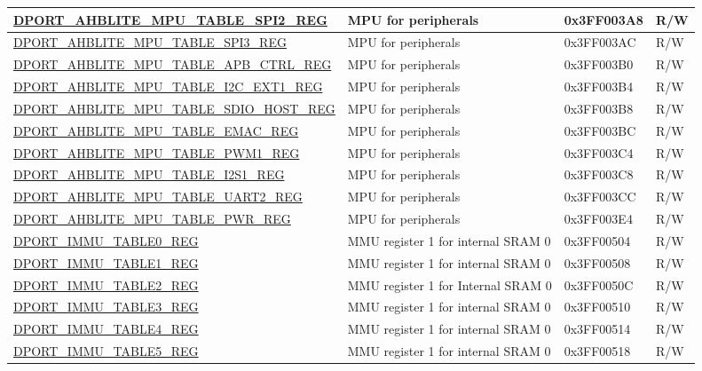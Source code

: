 \begin{longtable}{ |L{8.2cm} | L{4.5cm} | l | l | }
\hyperref[regdesc:AHBLITEMPUTABLESPI2REG]{DPORT\_AHBLITE\_MPU\_TABLE\_SPI2\_REG} & MPU for peripherals & 0x3FF003A8 & R/W \\ \hline
\hyperref[regdesc:AHBLITEMPUTABLESPI3REG]{DPORT\_AHBLITE\_MPU\_TABLE\_SPI3\_REG} & MPU for peripherals & 0x3FF003AC & R/W \\ \hline
\hyperref[regdesc:AHBLITEMPUTABLEAPBCTRLREG]{DPORT\_AHBLITE\_MPU\_TABLE\_APB\_CTRL\_REG} & MPU for peripherals & 0x3FF003B0 & R/W \\ \hline
\hyperref[regdesc:AHBLITEMPUTABLEI2CEXT1REG]{DPORT\_AHBLITE\_MPU\_TABLE\_I2C\_EXT1\_REG} & MPU for peripherals & 0x3FF003B4 & R/W \\ \hline
\hyperref[regdesc:AHBLITEMPUTABLESDIOHOSTREG]{DPORT\_AHBLITE\_MPU\_TABLE\_SDIO\_HOST\_REG} & MPU for peripherals & 0x3FF003B8 & R/W \\ \hline
\hyperref[regdesc:AHBLITEMPUTABLEEMACREG]{DPORT\_AHBLITE\_MPU\_TABLE\_EMAC\_REG} & MPU for peripherals & 0x3FF003BC & R/W \\ \hline
\hyperref[regdesc:AHBLITEMPUTABLEPWM1REG]{DPORT\_AHBLITE\_MPU\_TABLE\_PWM1\_REG} & MPU for peripherals & 0x3FF003C4 & R/W \\ \hline
\hyperref[regdesc:AHBLITEMPUTABLEI2S1REG]{DPORT\_AHBLITE\_MPU\_TABLE\_I2S1\_REG} & MPU for peripherals & 0x3FF003C8 & R/W \\ \hline
\hyperref[regdesc:AHBLITEMPUTABLEUART2REG]{DPORT\_AHBLITE\_MPU\_TABLE\_UART2\_REG} & MPU for peripherals & 0x3FF003CC & R/W \\ \hline
\hyperref[regdesc:AHBLITEMPUTABLEPWRREG]{DPORT\_AHBLITE\_MPU\_TABLE\_PWR\_REG} & MPU for peripherals & 0x3FF003E4 & R/W \\ \hline
\hyperref[regdesc:IMMUTABLEnREG]{DPORT\_IMMU\_TABLE0\_REG} & MMU register 1 for internal SRAM 0 & 0x3FF00504 & R/W \\ \hline
\hyperref[regdesc:IMMUTABLEnREG]{DPORT\_IMMU\_TABLE1\_REG} & MMU register 1 for internal SRAM 0 & 0x3FF00508 & R/W \\ \hline
\hyperref[regdesc:IMMUTABLEnREG]{DPORT\_IMMU\_TABLE2\_REG} & MMU register 1 for Internal SRAM 0 & 0x3FF0050C & R/W \\ \hline
\hyperref[regdesc:IMMUTABLEnREG]{DPORT\_IMMU\_TABLE3\_REG} & MMU register 1 for internal SRAM 0 & 0x3FF00510 & R/W \\ \hline
\hyperref[regdesc:IMMUTABLEnREG]{DPORT\_IMMU\_TABLE4\_REG} & MMU register 1 for internal SRAM 0 & 0x3FF00514 & R/W \\ \hline
\hyperref[regdesc:IMMUTABLEnREG]{DPORT\_IMMU\_TABLE5\_REG} & MMU register 1 for internal SRAM 0 & 0x3FF00518 & R/W \\ \hline

\end{longtable}
